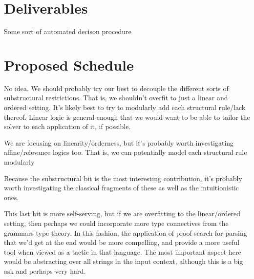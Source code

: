 \documentclass{article}
\begin{document}
\section{Deliverables}
Some sort of automated decison procedure

\section{Proposed Schedule}
No idea. We should probably try our best to decouple the different sorts of
substructural restrictions. That is, we shouldn't overfit to just a linear and
ordered setting. It's likely best to try to modularly add each structural
rule/lack thereof. Linear logic is general enough that we would want to be able
to tailor the solver to each application of it, if possible.

We are focusing on
linearity/orderness, but it's probably worth investigating affine/relevance
logics too. That is, we can potentially model each structural rule modularly

Because the substructural bit is the most interesting contribution, it's probably worth
investigating the classical fragments of these as well as the intuitionistic ones.

This last bit is more self-serving, but if we are overfitting to the
linear/ordered setting, then perhaps we could incorporate more type connectives
from the grammars type theory. In this fashion, the application of
proof-search-for-parsing that we'd get at the
end would be more compelling, and provide a more useful tool when viewed as a
tactic in that language. The most important aspect here would be abstracting
over all strings in the input context, although this is a big ask and perhaps
very hard.




\end{document}

